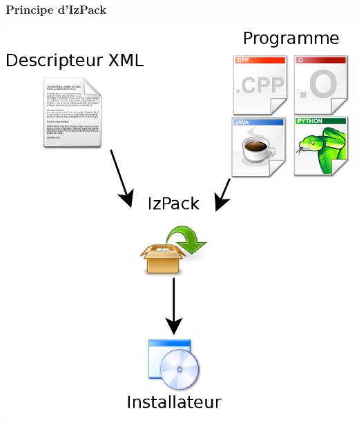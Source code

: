 \begin{frame}\frametitle{Principe d'IzPack}
\includegraphics[height=1\textheight]{../image/izpackInstall.png}
\end{frame}
